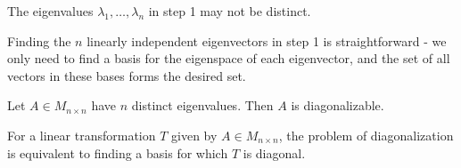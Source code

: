 \begin{remark}
    The eigenvalues \(\lambda _1,\ldots,\lambda _n\) in step 1 may not be distinct.
\end{remark}
\begin{remark}
    Finding the \(n\) linearly independent eigenvectors in step 1 is straightforward - we only need to find a basis for the eigenspace of each eigenvector, and the set of all vectors in these bases forms the desired set.
\end{remark}
\begin{theorem}
    Let \(A\in M_{n\times n}\) have \(n\) distinct eigenvalues. Then \(A\) is diagonalizable.
\end{theorem}
For a linear transformation \(T\) given by \(A\in M_{n\times n}\), the problem of diagonalization is equivalent to finding a basis for which \(T\) is diagonal. 